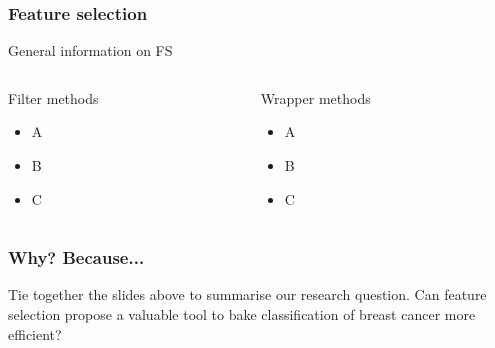 \documentclass[aspectratio=1610]{beamer}
\begin{document}
\begin{frame}
  \frametitle{\hfill Feature selection}
  General information on FS
  \begin{columns}[T]
    \begin{column}{.5\textwidth}
      \begin{block}{Filter methods}
        \begin{itemize}
          \item A
          \item B
          \item C
        \end{itemize}
      \end{block}
    \end{column}
    \begin{column}{.5\textwidth}
      \begin{block}{Wrapper methods}
        \begin{itemize}
          \item A
          \item B
          \item C
        \end{itemize}
      \end{block}
    \end{column}
  \end{columns}
\end{frame}

\begin{frame}
  \frametitle{\hfill Why? Because...}
  Tie together the slides above to summarise our research question. Can feature selection propose a valuable tool to bake classification of breast cancer more efficient?
\end{frame}

\end{document}
